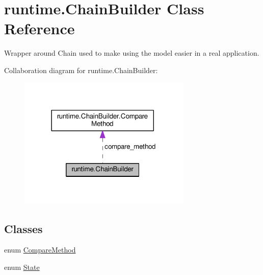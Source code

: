 \hypertarget{classruntime_1_1_chain_builder}{}\section{runtime.\+Chain\+Builder Class Reference}
\label{classruntime_1_1_chain_builder}


Wrapper around Chain used to make using the model easier in a real application.  




Collaboration diagram for runtime.\+Chain\+Builder\+:\nopagebreak
\begin{figure}[H]
\begin{center}
\leavevmode
\includegraphics[width=234pt]{classruntime_1_1_chain_builder__coll__graph}
\end{center}
\end{figure}
\subsection*{Classes}
\begin{DoxyCompactItemize}
\item 
enum \hyperlink{enumruntime_1_1_chain_builder_1_1_compare_method}{Compare\+Method}
\item 
enum \hyperlink{enumruntime_1_1_chain_builder_1_1_state}{State}
\end{DoxyCompactItemize}

